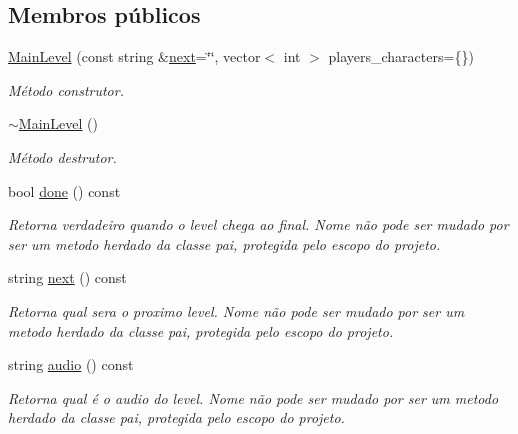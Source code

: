 \subsection*{Membros públicos}
\begin{DoxyCompactItemize}
\item 
\mbox{\hyperlink{classMainLevel_a0d8c61bddf5781cea1ba8496bd0a3d80}{Main\+Level}} (const string \&\mbox{\hyperlink{classMainLevel_ac5631405cb489d6ca9d90eb385c91293}{next}}=\char`\"{}\char`\"{}, vector$<$ int $>$ players\+\_\+characters=\{\})
\begin{DoxyCompactList}\small\item\em Método construtor. \end{DoxyCompactList}\item 
\mbox{\label{classMainLevel_ad8795dada6fdf0c1c0fb19695ae236d2}} 
\mbox{\hyperlink{classMainLevel_ad8795dada6fdf0c1c0fb19695ae236d2}{$\sim$\+Main\+Level}} ()
\begin{DoxyCompactList}\small\item\em Método destrutor. \end{DoxyCompactList}\item 
bool \mbox{\hyperlink{classMainLevel_ae4d34d88753d7ebe90320e3cdd3e9e17}{done}} () const
\begin{DoxyCompactList}\small\item\em Retorna verdadeiro quando o level chega ao final. Nome não pode ser mudado por ser um metodo herdado da classe pai, protegida pelo escopo do projeto. \end{DoxyCompactList}\item 
string \mbox{\hyperlink{classMainLevel_ac5631405cb489d6ca9d90eb385c91293}{next}} () const
\begin{DoxyCompactList}\small\item\em Retorna qual sera o proximo level. Nome não pode ser mudado por ser um metodo herdado da classe pai, protegida pelo escopo do projeto. \end{DoxyCompactList}\item 
string \mbox{\hyperlink{classMainLevel_ae101ab154173ca819a5eb701508ad635}{audio}} () const
\begin{DoxyCompactList}\small\item\em Retorna qual é o audio do level. Nome não pode ser mudado por ser um metodo herdado da classe pai, protegida pelo escopo do projeto. \end{DoxyCompactList}\end{DoxyCompactItemize}
